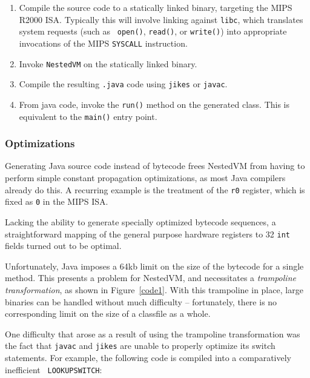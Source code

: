 \documentclass{acmconf}
\begin{document}
\begin{enumerate}

\item Compile the source code to a statically linked binary, targeting
      the MIPS R2000 ISA.  Typically this will involve linking against
      {\tt libc}, which translates system requests (such as {\tt
      open()}, {\tt read()}, or {\tt write()}) into appropriate
      invocations of the MIPS {\tt SYSCALL} instruction.

\item Invoke {\tt NestedVM} on the statically linked binary.

\item Compile the resulting {\tt .java} code using {\tt jikes}
      \cite{jikes} or {\tt javac}.

\item From java code, invoke the {\tt run()} method on the generated
      class.  This is equivalent to the {\tt main()} entry point.

\end{enumerate}

\subsubsection{Optimizations}

Generating Java source code instead of bytecode frees NestedVM from
having to perform simple constant propagation optimizations, as most
Java compilers already do this.  A recurring example is the treatment
of the {\tt r0} register, which is fixed as {\tt 0} in the MIPS ISA.

Lacking the ability to generate specially optimized bytecode
sequences, a straightforward mapping of the general purpose hardware
registers to 32 {\tt int} fields turned out to be optimal.



Unfortunately, Java imposes a 64kb limit on the size of the bytecode
for a single method.  This presents a problem for NestedVM, and
necessitates a {\it trampoline transformation}, as shown in
Figure~\ref{code1}.  With this trampoline in place, large binaries can
be handled without much difficulty -- fortunately, there is no
corresponding limit on the size of a classfile as a whole.

One difficulty that arose as a result of using the trampoline
transformation was the fact that {\tt javac} and {\tt jikes} are
unable to properly optimize its switch statements.  For example, the
following code is compiled into a comparatively inefficient {\tt
LOOKUPSWITCH}:
\end{document}
